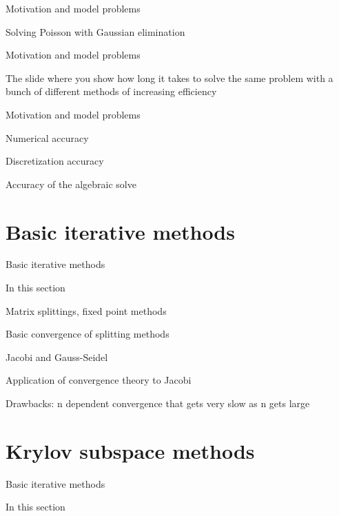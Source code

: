 \documentclass[18pt,xcolor=table]{beamer}
\begin{document}
\begin{frame}{Motivation and model problems}
\begin{block}{Solving Poisson with Gaussian elimination}
\bit
\item 
\eit
\end{block}

\end{frame}








\begin{frame}{Motivation and model problems}
\begin{block}{The slide where you show how long it takes to solve the same problem with a bunch of different methods of increasing efficiency}
\bit
\item 
\eit
\end{block}

\end{frame}






\begin{frame}{Motivation and model problems}
\begin{block}{Numerical accuracy}
\bit
\item Discretization accuracy
\item Accuracy of the algebraic solve
\eit
\end{block}

\end{frame}


\section{Basic iterative methods}

\begin{frame}{Basic iterative methods}
\begin{block}{In this section}
\bit
\item Matrix splittings, fixed point methods
\item Basic convergence of splitting methods
\item Jacobi and Gauss-Seidel
\item Application of convergence theory to Jacobi
\item Drawbacks: n dependent convergence that gets very slow as n gets large
\eit
\end{block}

\end{frame}


\section{Krylov subspace methods}

\begin{frame}{Basic iterative methods}
\begin{block}{In this section}
\bit
\item 
\eit
\end{block}

\end{frame}
\end{document}
